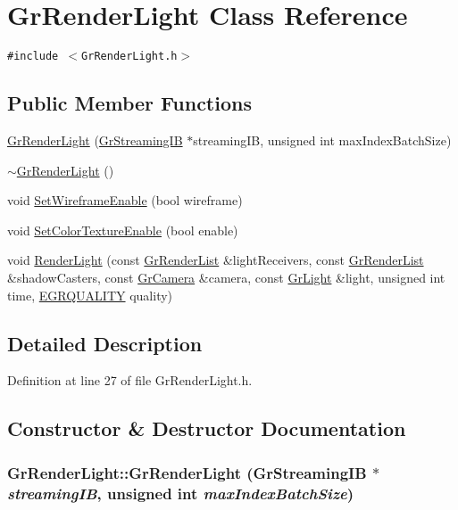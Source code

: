 \hypertarget{class_gr_render_light}{
\section{GrRenderLight Class Reference}
\label{class_gr_render_light}
}
{\tt \#include $<$GrRenderLight.h$>$}

\subsection*{Public Member Functions}
\begin{CompactItemize}
\item 
\hyperlink{class_gr_render_light_d8c412494b80120340690ce6b2934ddc}{GrRenderLight} (\hyperlink{class_gr_streaming_i_b}{GrStreamingIB} $\ast$streamingIB, unsigned int maxIndexBatchSize)
\item 
\hyperlink{class_gr_render_light_a40834d7c8455b570eefea6518bd8254}{$\sim$GrRenderLight} ()
\item 
void \hyperlink{class_gr_render_light_54d51afb9a0c33cb1ada63e4965df88f}{SetWireframeEnable} (bool wireframe)
\item 
void \hyperlink{class_gr_render_light_96e77ad600ecdd3d4db377909457af20}{SetColorTextureEnable} (bool enable)
\item 
void \hyperlink{class_gr_render_light_ea1e59d002ca4e91abd8a27bbeaf6f4d}{RenderLight} (const \hyperlink{class_gr_render_list}{GrRenderList} \&lightReceivers, const \hyperlink{class_gr_render_list}{GrRenderList} \&shadowCasters, const \hyperlink{class_gr_camera}{GrCamera} \&camera, const \hyperlink{class_gr_light}{GrLight} \&light, unsigned int time, \hyperlink{enums_8h_697c1ee1354746841860d5bf9f81c033}{EGRQUALITY} quality)
\end{CompactItemize}


\subsection{Detailed Description}


Definition at line 27 of file GrRenderLight.h.

\subsection{Constructor \& Destructor Documentation}
\hypertarget{class_gr_render_light_d8c412494b80120340690ce6b2934ddc}{
\subsubsection[{GrRenderLight}]{\setlength{\rightskip}{0pt plus 5cm}GrRenderLight::GrRenderLight ({\bf GrStreamingIB} $\ast$ {\em streamingIB}, \/  unsigned int {\em maxIndexBatchSize})}}
\label{class_gr_render_light_d8c412494b80120340690ce6b2934ddc}




